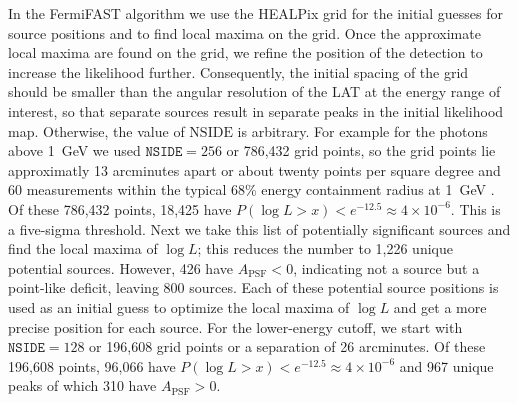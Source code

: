 \documentclass[useAMS,usenatbib]{mn2e}
\begin{document}
In the FermiFAST algorithm we use the HEALPix grid for the initial
guesses for source positions and to find local maxima on the grid.
Once the approximate local maxima are found on the grid, we refine the
position of the detection to increase the likelihood further.
Consequently, the initial spacing of the grid should be smaller than
the angular resolution of the LAT at the energy range of interest, so
that separate sources result in separate peaks in the initial
likelihood map.  Otherwise, the value of $\mathrm{NSIDE}$ is
arbitrary.  For example for the photons above 1~GeV we used
$\mathtt{NSIDE}=256$ or 786,432 grid points, so the grid points lie
approximatly 13 arcminutes apart or about twenty points per square
degree and 60 measurements within the typical 68\% energy containment
radius at 1~GeV \citep{2012ApJS..203....4A}. Of these 786,432 points,
18,425 have $P(\log L >x) < e^{-12.5} \approx 4 \times 10^{-6}$.  This
is a five-sigma threshold. Next we take this list of potentially
significant sources and find the local maxima of $\log L$; this
reduces the number to 1,226 unique potential sources.  However, 426
have $A_\mathrm{PSF}<0$, indicating not a source but a point-like
deficit, leaving 800 sources.  Each of these potential source
positions is used as an initial guess to optimize the local maxima of
$\log L$ and get a more precise position for each source.  For the
lower-energy cutoff, we start with $\mathtt{NSIDE}=128$ or 196,608
grid points or a separation of 26 arcminutes.  Of these 196,608
points, 96,066 have $P(\log L >x) < e^{-12.5} \approx 4 \times
10^{-6}$ and 967 unique peaks of which 310 have $A_\mathrm{PSF}>0$.
\end{document}

